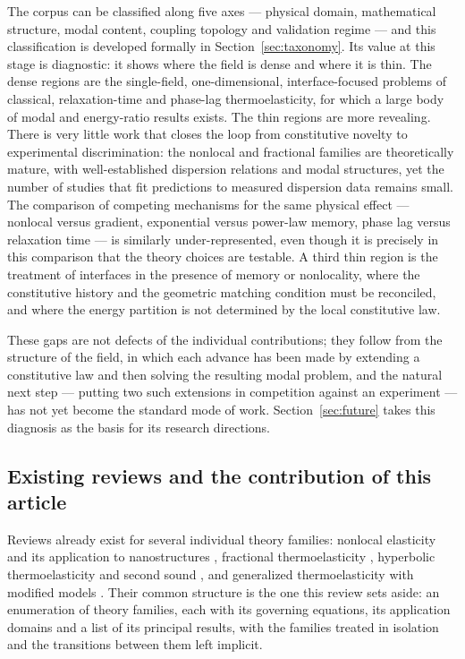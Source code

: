 The corpus can be classified along five axes --- physical domain, mathematical structure, modal content, coupling topology and validation regime --- and this classification is developed formally in Section~\ref{sec:taxonomy}. Its value at this stage is diagnostic: it shows where the field is dense and where it is thin. The dense regions are the single-field, one-dimensional, interface-focused problems of classical, relaxation-time and phase-lag thermoelasticity, for which a large body of modal and energy-ratio results exists. The thin regions are more revealing. There is very little work that closes the loop from constitutive novelty to experimental discrimination: the nonlocal and fractional families are theoretically mature, with well-established dispersion relations and modal structures, yet the number of studies that fit predictions to measured dispersion data remains small. The comparison of competing mechanisms for the same physical effect --- nonlocal versus gradient, exponential versus power-law memory, phase lag versus relaxation time --- is similarly under-represented, even though it is precisely in this comparison that the theory choices are testable. A third thin region is the treatment of interfaces in the presence of memory or nonlocality, where the constitutive history and the geometric matching condition must be reconciled, and where the energy partition is not determined by the local constitutive law.

These gaps are not defects of the individual contributions; they follow from the structure of the field, in which each advance has been made by extending a constitutive law and then solving the resulting modal problem, and the natural next step --- putting two such extensions in competition against an experiment --- has not yet become the standard mode of work. Section~\ref{sec:future} takes this diagnosis as the basis for its research directions.

\subsection{Existing reviews and the contribution of this article}

Reviews already exist for several individual theory families: nonlocal elasticity and its application to nanostructures \cite{Askes2006,Askes2011,Maranganti2007}, fractional thermoelasticity \cite{Chandrasekharaiah1998,Povstenko2016}, hyperbolic thermoelasticity and second sound \cite{Chandrasekharaiah1996,Joseph1989}, and generalized thermoelasticity with modified models \cite{Shakeriaski2021}. Their common structure is the one this review sets aside: an enumeration of theory families, each with its governing equations, its application domains and a list of its principal results, with the families treated in isolation and the transitions between them left implicit.

